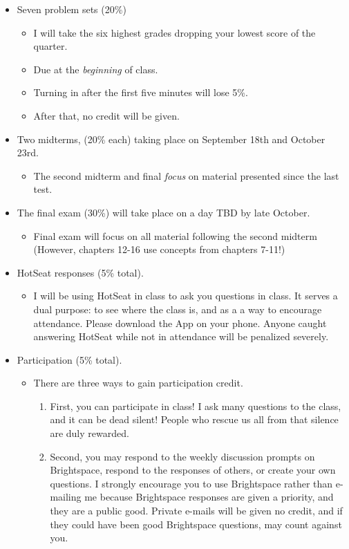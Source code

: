 \documentclass[a4paper]{article}
\begin{document}
\begin{itemize}
\item Seven problem sets (20\%)
\begin{itemize}
\item I will take the six highest grades dropping your lowest score of the quarter.
\item Due at the \emph{beginning} of class.
\item Turning in after the first five minutes will lose 5\%.
\item After that, no credit will be given.
\end{itemize}
\item Two midterms, (20\% each) taking place on September 18th and October 23rd.  
\begin{itemize}
\item The second midterm and final \emph{focus} on material presented since the last test.
\end{itemize}
\item The final exam (30\%) will take place on a day TBD by late October.
\begin{itemize}
\item Final exam will focus on all material following the second midterm (However, chapters 12-16 use concepts from chapters 7-11!) 
\end{itemize}
\item HotSeat responses (5\% total).
\begin{itemize}
\item I will be using HotSeat in class to ask you questions in class.  It serves a dual purpose:  to see where the class is, and as a a way to encourage attendance.  Please download the App on your phone.  Anyone caught answering HotSeat while not in attendance will be penalized severely.
\end{itemize}
\item Participation (5\% total).
\begin{itemize}
\item There are three ways to gain participation credit.
\begin{enumerate}
\item First, you can participate in class!  I ask many questions to the class, and it can be dead silent!  People who rescue us all from that silence are duly rewarded.
\item Second, you may respond to the weekly discussion prompts on Brightspace, respond to the responses of others, or create your own questions.  I strongly encourage you to use Brightspace rather than e-mailing me because Brightspace responses are given a priority, and they are a public good.  Private e-mails will be given no credit, and if they could have been good Brightspace questions, may count against you.

\end{enumerate}
\end{itemize}
\end{itemize}
\end{document}
